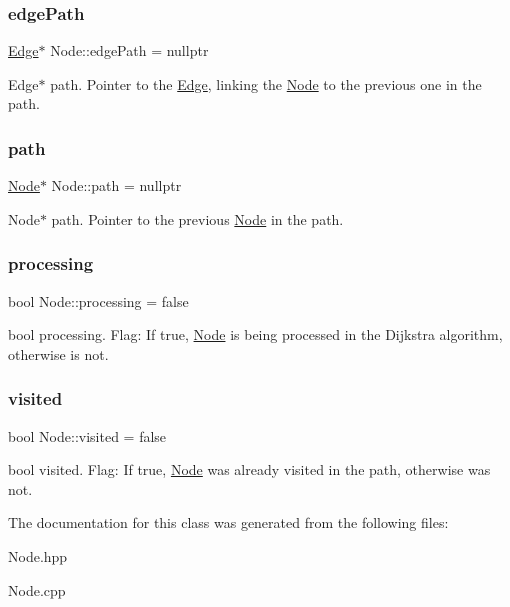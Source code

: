 \subsubsection{\texorpdfstring{edge\+Path}{edgePath}}
{\footnotesize\ttfamily \hyperlink{class_edge}{Edge}$\ast$ Node\+::edge\+Path = nullptr}

Edge$\ast$ path. Pointer to the \hyperlink{class_edge}{Edge}, linking the \hyperlink{class_node}{Node} to the previous one in the path. \hypertarget{class_node_a569c555f532e04a5ef976a54cd3c82a0}{}\label{class_node_a569c555f532e04a5ef976a54cd3c82a0} 
\subsubsection{\texorpdfstring{path}{path}}
{\footnotesize\ttfamily \hyperlink{class_node}{Node}$\ast$ Node\+::path = nullptr}

Node$\ast$ path. Pointer to the previous \hyperlink{class_node}{Node} in the path. \hypertarget{class_node_ac54c0bde41664161566c30ccf4f8a53e}{}\label{class_node_ac54c0bde41664161566c30ccf4f8a53e} 
\subsubsection{\texorpdfstring{processing}{processing}}
{\footnotesize\ttfamily bool Node\+::processing = false}

bool processing. Flag\+: If true, \hyperlink{class_node}{Node} is being processed in the Dijkstra algorithm, otherwise is not. \hypertarget{class_node_aa1bdec4e775fc578632e6a2dced9e251}{}\label{class_node_aa1bdec4e775fc578632e6a2dced9e251} 
\subsubsection{\texorpdfstring{visited}{visited}}
{\footnotesize\ttfamily bool Node\+::visited = false}

bool visited. Flag\+: If true, \hyperlink{class_node}{Node} was already visited in the path, otherwise was not. 

The documentation for this class was generated from the following files\+:\begin{DoxyCompactItemize}
\item 
Node.\+hpp\item 
Node.\+cpp\end{DoxyCompactItemize}
